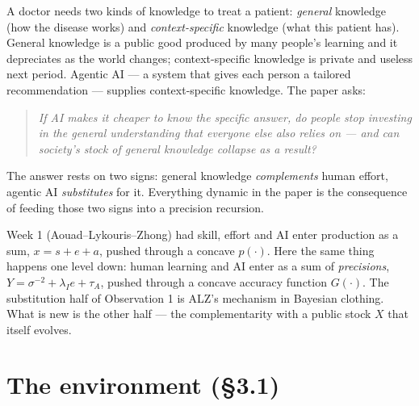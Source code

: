 \documentclass[11pt,a4paper]{article}
\theoremstyle{definition}
\theoremstyle{remark}
\newcommand{\tA}{\tau_A}
\newcommand{\lI}{\lambda_I}
\begin{document}
A doctor needs two kinds of knowledge to treat a patient: \emph{general} knowledge (how the disease works)
and \emph{context-specific} knowledge (what this patient has). General knowledge is a public good produced
by many people's learning and it depreciates as the world changes; context-specific knowledge is private
and useless next period. Agentic AI --- a system that gives each person a tailored recommendation ---
supplies context-specific knowledge. The paper asks:
\begin{quote}
\emph{If AI makes it cheaper to know the specific answer, do people stop investing in the general
understanding that everyone else also relies on --- and can society's stock of general knowledge
collapse as a result?}
\end{quote}
The answer rests on two signs: general knowledge \emph{complements} human effort, agentic AI
\emph{substitutes} for it. Everything dynamic in the paper is the consequence of feeding those two signs
into a precision recursion.

\begin{intuition}
Week 1 (Aouad--Lykouris--Zhong) had skill, effort and AI enter production as a sum, $x=s+e+a$, pushed
through a concave $p(\cdot)$. Here the same thing happens one level down: human learning and AI enter as a
sum of \emph{precisions}, $Y=\sigma^{-2}+\lI e+\tA$, pushed through a concave accuracy function $G(\cdot)$.
The substitution half of Observation 1 is ALZ's mechanism in Bayesian clothing. What is new is the other
half --- the complementarity with a public stock $X$ that itself evolves.
\end{intuition}

\section{The environment (\S3.1)}
\end{document}

